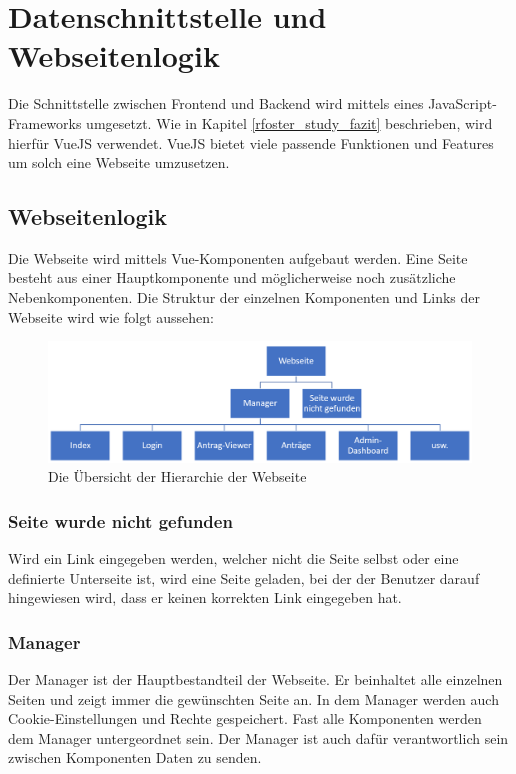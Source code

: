 \section{Datenschnittstelle und Webseitenlogik}
Die Schnittstelle zwischen Frontend und Backend wird mittels eines JavaScript-Frameworks umgesetzt. Wie in Kapitel \ref{rfoster_study_fazit} beschrieben, wird hierfür VueJS verwendet. VueJS bietet viele passende Funktionen und Features um solch eine Webseite umzusetzen.
\subsection{Webseitenlogik}
Die Webseite wird mittels Vue-Komponenten aufgebaut werden. Eine Seite besteht aus einer Hauptkomponente und möglicherweise noch zusätzliche Nebenkomponenten. Die Struktur der einzelnen Komponenten und Links der Webseite wird wie folgt aussehen:
\begin{figure}[H]
	\centering
	\includegraphics[width=0.8\linewidth]{images/Webseite_hierarchie}
	\caption[Die Hierarchie der Webseite]{Die Übersicht der Hierarchie der Webseite}
	\label{fig:webseitehierachie}
\end{figure}

\subsubsection{Seite wurde nicht gefunden}
Wird ein Link eingegeben werden, welcher nicht die Seite selbst oder eine definierte Unterseite ist, wird eine Seite geladen, bei der der Benutzer darauf hingewiesen wird, dass er keinen korrekten Link eingegeben hat.
\subsubsection{Manager}
Der Manager ist der Hauptbestandteil der Webseite. Er beinhaltet alle einzelnen Seiten und zeigt immer die gewünschten Seite an. In dem Manager werden auch Cookie-Einstellungen und Rechte gespeichert. Fast alle Komponenten werden dem Manager untergeordnet sein. Der Manager ist auch dafür verantwortlich sein zwischen Komponenten Daten zu senden.

